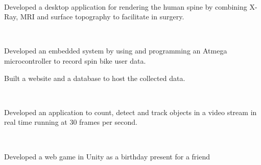 \documentclass[]{sumbal-resume}
\begin{document}
\begin{minipage}[t]{0.66\textwidth}
	 \\
	\begin{tightemize}
		\item Developed a desktop application for rendering the human spine by combining X-Ray, MRI and surface topography to facilitate in surgery. 
	\end{tightemize}

	 \\
	\begin{tightemize}
		\item Developed an embedded system by using and programming an Atmega microcontroller to record spin bike user data.
		\item Built a website and a database to host the collected data.
	\end{tightemize}

	 \\
	\begin{tightemize}
		\item Developed an application to count, detect and track objects in a video stream in real time running at $30$ frames per second.
	\end{tightemize}

	 \\
	\begin{tightemize}
		\item Developed a web game in Unity as a birthday present for a friend
	\end{tightemize}

\end{minipage}
\end{document}
